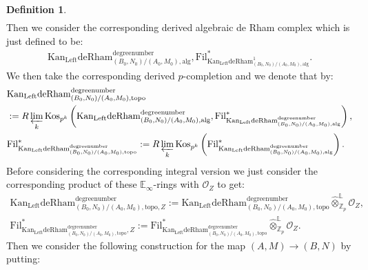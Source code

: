 \documentclass[11pt]{book}
\theoremstyle{definition}
\newtheorem{definition}[theorem]{Definition}
\numberwithin{equation}{section}
\begin{document}
\begin{definition}
\begin{align}
\end{align}
Then we consider the corresponding derived algebraic de Rham complex which is just defined to be:
\begin{align}
\mathrm{Kan}_\mathrm{Left}\mathrm{deRham}^\text{degreenumber}_{(B_0,N_0)/(A_0,M_0),\mathrm{alg}},\mathrm{Fil}^*_{\mathrm{Kan}_\mathrm{Left}\mathrm{deRham}^1_{(B_0,N_0)/(A_0,M_0),\mathrm{alg}}}.	
\end{align}
We then take the corresponding derived $p$-completion and we denote that by:
\begin{align}
&\mathrm{Kan}_\mathrm{Left}\mathrm{deRham}^\text{degreenumber}_{(B_0,N_0)/(A_0,M_0),\mathrm{topo}}\\
&:=R\varprojlim_k\mathrm{Kos}_{p^k}\left(\mathrm{Kan}_\mathrm{Left}\mathrm{deRham}^\text{degreenumber}_{(B_0,N_0)/(A_0,M_0),\mathrm{alg}},\mathrm{Fil}^*_{\mathrm{Kan}_\mathrm{Left}\mathrm{deRham}^\text{degreenumber}_{(B_0,N_0)/(A_0,M_0),\mathrm{alg}}}\right),\\
&\mathrm{Fil}^*_{\mathrm{Kan}_\mathrm{Left}\mathrm{deRham}^\text{degreenumber}_{(B_0,N_0)/(A_0,M_0),\mathrm{topo}}}:=R\varprojlim_k\mathrm{Kos}_{p^k}\left(\mathrm{Fil}^*_{\mathrm{Kan}_\mathrm{Left}\mathrm{deRham}^\text{degreenumber}_{(B_0,N_0)/(A_0,M_0),\mathrm{alg}}}\right).	
\end{align}
Before considering the corresponding integral version we just consider the corresponding product of these $\mathbb{E}_\infty$-rings with $\mathcal{O}_Z$ to get:
\begin{align}
\mathrm{Kan}_\mathrm{Left}\mathrm{deRham}^\text{degreenumber}_{(B_0,N_0)/(A_0,M_0),\mathrm{topo},Z}:=\mathrm{Kan}_\mathrm{Left}\mathrm{deRham}^\text{degreenumber}_{(B_0,N_0)/(A_0,M_0),\mathrm{topo}}\widehat{\otimes}^\mathbb{L}_{\mathbb{Z}_p}\mathcal{O}_Z,\\
\mathrm{Fil}^*_{\mathrm{Kan}_\mathrm{Left}\mathrm{deRham}^\text{degreenumber}_{(B_0,N_0)/(A_0,M_0),\mathrm{topo}},Z}:=\mathrm{Fil}^*_{\mathrm{Kan}_\mathrm{Left}\mathrm{deRham}^\text{degreenumber}_{(B_0,N_0)/(A_0,M_0),\mathrm{topo}}}\widehat{\otimes}^\mathbb{L}_{\mathbb{Z}_p}\mathcal{O}_Z.	
\end{align}
Then we consider the following construction for the map $(A,M)\rightarrow (B,N)$ by putting:


\end{definition}
\end{document}
